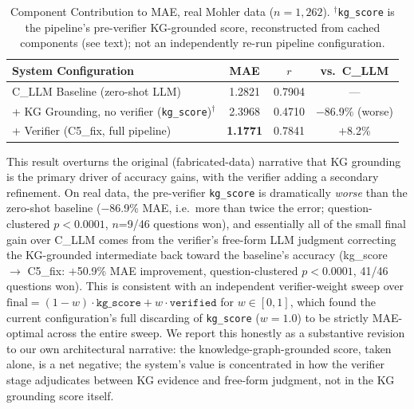 \documentclass[journal,review]{vgtc}
\begin{document}
\begin{table}[ht]
\centering
\caption{Component Contribution to MAE, real Mohler data ($n=1{,}262$). $^{\dagger}$\texttt{kg\_score} is the pipeline's pre-verifier KG-grounded score, reconstructed from cached components (see text); not an independently re-run pipeline configuration.}
\label{tab:ablation}
\small
\begin{tabular}{lccc}
\toprule
\textbf{System Configuration} & \textbf{MAE} & \textbf{$r$} & \textbf{vs.\ C\_LLM} \\
\midrule
C\_LLM Baseline (zero-shot LLM) & 1.2821 & 0.7904 & --- \\
+ KG Grounding, no verifier (\texttt{kg\_score})$^{\dagger}$ & 2.3968 & 0.4710 & $-$86.9\% (worse) \\
+ Verifier (C5\_fix, full pipeline) & \textbf{1.1771} & 0.7841 & $+$8.2\% \\
\bottomrule
\end{tabular}
\end{table}

This result overturns the original (fabricated-data) narrative that KG
grounding is the primary driver of accuracy gains, with the verifier
adding a secondary refinement. On real data, the pre-verifier
\texttt{kg\_score} is dramatically \emph{worse} than the zero-shot
baseline ($-$86.9\% MAE, i.e.\ more than twice the error; question-clustered
$p<0.0001$, $n$=9/46 questions won), and essentially all of the small
final gain over C\_LLM comes from the verifier's free-form LLM judgment
correcting the KG-grounded intermediate back toward the baseline's
accuracy (kg\_score $\to$ C5\_fix: $+$50.9\% MAE improvement, question-clustered
$p<0.0001$, 41/46 questions won). This is consistent with an independent
verifier-weight sweep over $\mathrm{final} = (1-w)\cdot\mathtt{kg\_score} + w\cdot\mathtt{verified}$
for $w\in[0,1]$, which found the current configuration's full discarding
of \texttt{kg\_score} ($w=1.0$) to be strictly MAE-optimal across the
entire sweep. We report this honestly as a substantive revision to our own
architectural narrative: the knowledge-graph-grounded score, taken alone,
is a net negative; the system's value is concentrated in how the
verifier stage adjudicates between KG evidence and free-form judgment,
not in the KG grounding score itself.
\end{document}
